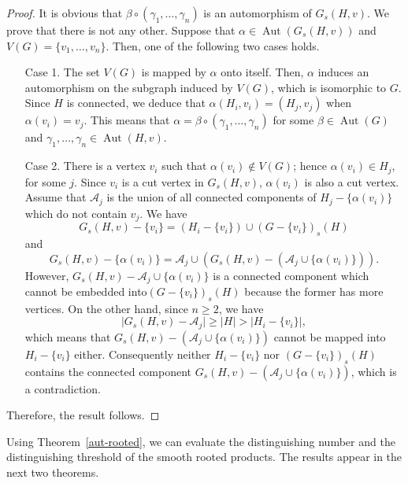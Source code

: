 \documentclass[12pt,a4paper, longbibliography]{article}
\newcommand{\Aut}{\ensuremath{\operatorname{Aut}}}
\theoremstyle{definition}
\numberwithin{equation}{section}
\begin{document}
	\begin{proof}
		It is obvious that $\beta \circ \left( \gamma_1,\ldots,\gamma_n\right)$ is an automorphism of $G_s(H,v)$. We prove that there is not any other. Suppose that $\alpha\in\Aut(G_s(H,v))$ and $V(G)=\{v_1,\ldots,v_n\}$. Then, one of the following two cases holds.
		
		\begin{itemize}
			\item[Case 1.] The set $V(G)$ is mapped by $\alpha$ onto itself. Then, $\alpha$ induces an automorphism on the subgraph induced by $V(G)$, which is isomorphic to $G$. Since $H$ is   connected, we deduce that $\alpha (H_i,v_i)=(H_j,v_j)$ when $\alpha(v_i)=v_j$. This means that $\alpha=\beta \circ \left( \gamma_1,\ldots,\gamma_n\right)$ for some $\beta\in\Aut(G)$ and $\gamma_1,\ldots , \gamma_n \in \Aut(H,v)$.
			\item[Case 2.] There is a vertex  $v_i$ such that $\alpha(v_i)\notin V(G)$; hence $\alpha(v_i)\in H_j$, for some $j$. Since $v_i$ is a cut vertex in $G_s(H,v)$, $\alpha (v_i)$ is also a cut vertex. Assume  that $\mathcal{A}_j$ is  the union of all connected components of $H_j  -  \{\alpha(v_i) \}$  which do  not contain $v_j$. We have 
			\[
			G_s(H,v) -  \{v_i\}=\left( H_i -  \{v_i\}\right) \cup \left(G -  \{v_i\}\right)_s(H)
			\]
			and
			\[
			G_s(H,v) -  \{\alpha(v_i)\}= \mathcal{A}_j\cup \left( G_s(H,v) -  \left(\mathcal{A}_j \cup \{\alpha(v_i)\}\right) \right) . 
			\]
			However, $G_s(H,v) -  \mathcal{A}_j\cup \{\alpha(v_i)\}$ is a connected component which cannot be embedded into\linebreak $\left(G -  \{v_i\}\right)_s(H)$ because the former  has more vertices. On the other hand, since $n\geq 2$, we have 
			\[
			\vert G_s(H,v) -  \mathcal{A}_j\vert\geq\vert H\vert>\vert H_i -  \{v_i\} \vert,
			\]
			which means that $G_s(H,v) -  \left(\mathcal{A}_j\cup \{\alpha(v_i)\}\right)$ cannot be mapped into $H_i -  \{v_i\}$ either. Consequently neither $H_i -  \{v_i\}$ nor $ \left(G -  \{v_i\}\right)_s(H)$ contains the connected component $G_s(H,v) -  \left(\mathcal{A}_j\cup \{\alpha(v_i)\}\right)$, which is a contradiction.
		\end{itemize}
		Therefore, the result follows.
	\end{proof}
	
	Using Theorem~\ref{aut-rooted}, we can evaluate the distinguishing number and the distinguishing threshold of the smooth rooted products.  The results appear in the next two theorems.
	
\end{document}
